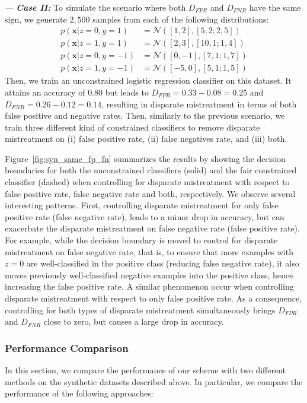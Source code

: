 \documentclass[letterpaper]{sig-alternate-2013}
\newcommand{\xhdr}[1]{\vspace{0.5mm}\noindent{{\bf #1.}}}
\newcommand{\disc}{disparate mistreatment}
\begin{document}
\vspace{1.5mm}
\noindent \emph{--- \bf Case II:}
To simulate the scenario where both $D_{FPR}$ and $D_{FNR}$ have the same sign, we generate $2{,}500$ samples from each
of the following distributions:
\begin{align}
p(\mathbf{x}|z=0, y=1) &= \mathcal{N}([1,2], [5, 2; 2, 5]) \nonumber \\
p(\mathbf{x}|z=1, y=1) &= \mathcal{N}([2,3], [10, 1; 1, 4]) \nonumber \\
p(\mathbf{x}|z=0, y=-1) &= \mathcal{N}([0,-1], [7, 1; 1, 7]) \nonumber \\
p(\mathbf{x}|z=1, y=-1) &= \mathcal{N}([-5,0], [5, 1; 1, 5]) \nonumber
\end{align}
Then, we train an unconstrained logistic regression classifier on this dataset. It attains an accuracy of $0.80$ but leads to $D_{FPR} = 0.33- 0.08 = 0.25$ and $D_{FNR} = 0.26-0.12 = 0.14$, resulting in  \disc{} in terms of both false positive and negative rates.
Then, similarly to the previous scenario, we train three different kind of constrained classifiers to remove \disc{} on (i) false positive rate, (ii) false negatives rate, and (iii) both.

\vspace{1.5mm}
\xhdr{Results} Figure~\ref{fig:syn_same_fp_fn} summarizes the results by showing  the decision boundaries for both the unconstrained classifiers (solid) and the fair constrained classifier (dashed) when controlling for \disc{} with respect to false positive rate, false negative rate and both, respectively.
We  observe several interesting patterns. First, controlling \disc{} for only false positive rate (false negative rate), leads to a minor drop in accuracy, but can exacerbate the \disc{} on false negative rate (false positive rate).
For example, while the decision boundary is moved to control for \disc{} on false negative rate, that is, to ensure that more examples with $z=0$ are well-classified in the positive class (reducing false negative rate), it also moves previously well-classified negative examples into the positive class, hence increasing the false positive rate.
A similar phenomenon occur when controlling \disc{} with respect to only false positive rate.
As a consequence, controlling for both types of \disc{} simultaneously brings $D_{FPR}$ and $D_{FNR}$ close to zero, but causes a large drop in accuracy.

\subsubsection{Performance Comparison}
\noindent
In this section, we compare the performance of our scheme with two different methods on the synthetic datasets described above.
In particular, we compare the performance of the following approaches:
\end{document}
